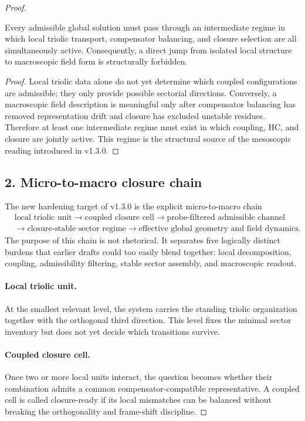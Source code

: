 \begin{proof}
\begin{lemma}
\label{lem:intermediate-balance}
Every admissible global solution must pass through an intermediate regime in
which local triolic transport, compensator balancing, and closure selection are
all simultaneously active. Consequently, a direct jump from isolated local
structure to macroscopic field form is structurally forbidden.
\end{lemma}

\begin{proof}
Local triolic data alone do not yet determine which coupled configurations are
admissible; they only provide possible sectorial directions. Conversely, a
macroscopic field description is meaningful only after compensator balancing
has removed representation drift and closure has excluded unstable residues.
Therefore at least one intermediate regime must exist in which coupling, HC,
and closure are jointly active. This regime is the structural source of the
mesoscopic reading introduced in v1.3.0.
\end{proof}

\subsection*{2. Micro-to-macro closure chain}
The new hardening target of v1.3.0 is the explicit micro-to-macro chain
\[
\begin{aligned}
&\text{local triolic unit} \longrightarrow \text{coupled closure cell} \longrightarrow \text{probe-filtered admissible channel}\\
&\longrightarrow \text{closure-stable sector regime} \longrightarrow \text{effective global geometry and field dynamics}.
\end{aligned}
\]
The purpose of this chain is not rhetorical. It separates five logically
distinct burdens that earlier drafts could too easily blend together:
local decomposition, coupling, admissibility filtering, stable sector assembly,
and macroscopic readout.

\paragraph{Local triolic unit.}
At the smallest relevant level, the system carries the standing triolic
organization together with the orthogonal third direction. This level fixes the
minimal sector inventory but does not yet decide which transitions survive.

\paragraph{Coupled closure cell.}
Once two or more local units interact, the question becomes whether their
combination admits a common compensator-compatible representative. A coupled
cell is called closure-ready if its local mismatches can be balanced without
breaking the orthogonality and frame-shift discipline.


\end{proof}
